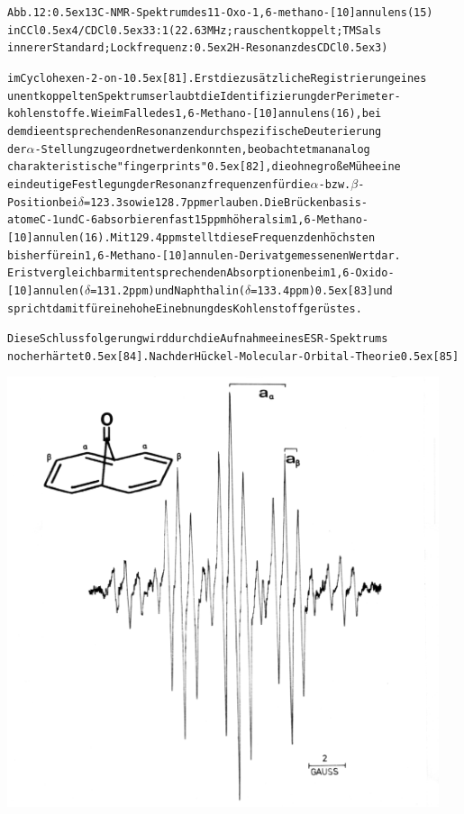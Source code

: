 \documentclass[a4paper,11pt]{article}
\begin{document}
\begin{alltt}
Abb. 12: \raise0.5ex\hbox{13}C-NMR-Spektrum des 11-Oxo-1‚6-methano-[10]annulens (15)
in CCl\lower0.5ex\hbox{4}/CDCl\lower0.5ex\hbox{3} 3:1 (22.63 MHz; rauschentkoppelt; TMS als
innerer Standard; Lockfrequenz: \raise0.5ex\hbox{2}H-Resonanz des CDCl\lower0.5ex\hbox{3})

im Cyclohexen-2-on-1 \raise0.5ex\hbox{[81]}. Erst die zusätzliche Registrierung eines
unentkoppelten Spektrums erlaubt die Identifizierung der Perimeter-
kohlenstoffe. Wie im Falle des 1,6-Methano-[10]annulens (16), bei
dem die entsprechenden Resonanzen durch spezifische Deuterierung
der \(\alpha\)-Stellung zugeordnet werden konnten, beobachtet man analog
charakteristische "fingerprints" \raise0.5ex\hbox{[82]}, die ohne große Mühe eine
eindeutige Festlegung der Resonanzfrequenzen für die \(\alpha\)- bzw. \(\beta\)-
Position bei \(\delta\) = 123.3 sowie 128.7 ppm erlauben. Die Brückenbasis-
atome C-1 und C-6 absorbieren fast 15 ppm höher als im 1,6-Methano-
[10]annulen (16). Mit 129.4 ppm stellt diese Frequenz den höchsten
bisher für ein 1,6-Methano-[10]annulen-Derivat gemessenen Wert dar.
Er ist vergleichbar mit entsprechenden Absorptionen beim 1,6-Oxido-
[10]annulen (\(\delta\) = 131.2 ppm) und Naphthalin (\(\delta\) = 133.4 ppm) \raise0.5ex\hbox{[83]} und
spricht damit für eine hohe Einebnung des Kohlenstoffgerüstes.

Diese Schlussfolgerung wird durch die Aufnahme eines ESR-Spektrums
noch erhärtet \raise0.5ex\hbox{[84]}. Nach der Hückel-Molecular-Orbital-Theorie \raise0.5ex\hbox{[85]}

\newpage
{}


\end{alltt}
\hspace*{-0.25cm}\includegraphics[width=12.675cm]{ESR_013}
\end{document}
